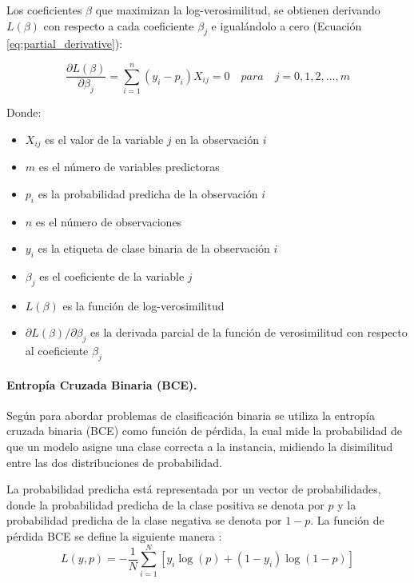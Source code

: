 Los coeficientes $\beta$ que maximizan la log-verosimilitud, se obtienen derivando $L(\beta)$ 
con respecto a cada coeficiente $\beta_{j}$ e igualándolo a cero (Ecuación \ref{eq:partial_derivative}):

\begin{equation}
    \frac{\partial L(\beta)}{\partial \beta_{j}} = \sum_{i=1}^{n} (y_{i} - p_{i})X_{ij} = 0 \quad para \quad j = 0, 1, 2, ..., m
    \label{eq:partial_derivative}
\end{equation}

Donde:
\begin{itemize}
    \item $X_{ij}$ es el valor de la variable $j$ en la observación $i$
    \item $m$ es el número de variables predictoras
    \item $p_{i}$ es la probabilidad predicha de la observación $i$
    \item $n$ es el número de observaciones
    \item $y_{i}$ es la etiqueta de clase binaria de la observación $i$
    \item $\beta_{j}$ es el coeficiente de la variable $j$
    \item $L(\beta)$ es la función de log-verosimilitud
    \item $\partial L(\beta) / \partial \beta_{j}$ es la derivada parcial de la función de verosimilitud con respecto al coeficiente $\beta_{j}$
\end{itemize}

\paragraph{Entropía Cruzada Binaria (BCE).}
Según \citet{wali_xtreme_2022} para abordar problemas de clasificación binaria se utiliza la entropía cruzada binaria (BCE) como función
de pérdida, la cual mide la probabilidad de que un modelo asigne una clase correcta a la instancia, midiendo la disimilitud entre
las dos distribuciones de probabilidad. 

La probabilidad predicha está representada por un vector de probabilidades, donde la probabilidad predicha de la clase positiva se denota por $p$ 
y la probabilidad predicha de la clase negativa se denota por $1 -p$. La función 
de pérdida BCE se define la siguiente manera \citep{terven_loss_2024}:
\begin{equation}
    L(y, p) = -\frac{1}{N} \sum_{i=1}^{N} [y_i \log(p) + (1 - y_i) \log(1 - p)]
    \label{eq:binary_cross_entropy}
\end{equation}

